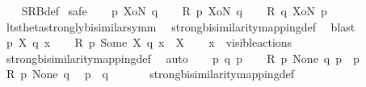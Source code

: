 \begin{isabellebody}
%
\isadelimproof
\ \ %
\endisadelimproof
%
\isatagproof
{}\isamarkupfalse%
\ SRB{\isacharunderscore}{\kern0pt}def\isanewline
{}\isamarkupfalse%
\ {\isacharparenleft}{\kern0pt}safe{\isacharparenright}{\kern0pt}\isanewline
\ \ \isamarkupfalse%
\ p\ XoN\ q\isanewline
\ \ \isamarkupfalse%
\ {\isacartoucheopen}{\isacharquery}{\kern0pt}R\ p\ XoN\ q{\isacartoucheclose}\isanewline
\ \ \isamarkupfalse%
\ {\isacartoucheopen}{\isacharquery}{\kern0pt}R\ q\ XoN\ p{\isacartoucheclose}\ \isamarkupfalse%
\ lts{\isacharunderscore}{\kern0pt}theta{\isachardot}{\kern0pt}strongly{\isacharunderscore}{\kern0pt}bisimilar{\isacharunderscore}{\kern0pt}symm\ \isamarkupfalse%
\ strong{\isacharunderscore}{\kern0pt}bisimilarity{\isacharunderscore}{\kern0pt}mapping{\isacharunderscore}{\kern0pt}def\ \isamarkupfalse%
\ blast\isanewline
{}\isamarkupfalse%
\isanewline
\ \ \isamarkupfalse%
\ p\ X\ q\ x\isanewline
\ \ \isamarkupfalse%
\ {\isacartoucheopen}{\isacharquery}{\kern0pt}R\ p\ {\isacharparenleft}{\kern0pt}Some\ X{\isacharparenright}{\kern0pt}\ q{\isacartoucheclose}\ {\isacartoucheopen}x\ {\isasymin}\ X{\isacartoucheclose}\isanewline
\ \ \isamarkupfalse%
\ {\isacartoucheopen}x\ {\isasymin}\ visible{\isacharunderscore}{\kern0pt}actions{\isacartoucheclose}\ \isamarkupfalse%
\ strong{\isacharunderscore}{\kern0pt}bisimilarity{\isacharunderscore}{\kern0pt}mapping{\isacharunderscore}{\kern0pt}def\ \isamarkupfalse%
\ auto\isanewline
{}\isamarkupfalse%
\isanewline
\ \ \isamarkupfalse%
\ p\ q\ p{\isacharprime}{\kern0pt}\isanewline
\ \ \isamarkupfalse%
\ {\isacartoucheopen}{\isacharquery}{\kern0pt}R\ p\ None\ q{\isacartoucheclose}\ {\isacartoucheopen}p\ {\isasymlongmapsto}{\isasymtau}\ p{\isacharprime}{\kern0pt}{\isacartoucheclose}\isanewline
\isanewline
\ \ \isamarkupfalse%
\ {\isacartoucheopen}{\isacharquery}{\kern0pt}R\ p\ None\ q{\isacartoucheclose}\ \isamarkupfalse%
\ {\isacartoucheopen}{\isacharparenleft}{\kern0pt}{\isasymtheta}{\isacharparenleft}{\kern0pt}p{\isacharparenright}{\kern0pt}{\isacharparenright}{\kern0pt}\ {\isasymleftrightarrow}\ {\isacharparenleft}{\kern0pt}{\isasymtheta}{\isacharparenleft}{\kern0pt}q{\isacharparenright}{\kern0pt}{\isacharparenright}{\kern0pt}{\isacartoucheclose}\ \isanewline
\ \ \ \ \isamarkupfalse%
\ strong{\isacharunderscore}{\kern0pt}bisimilarity{\isacharunderscore}{\kern0pt}mapping{\isacharunderscore}{\kern0pt}def\ \isamarkupfalse%

\end{isabellebody}
